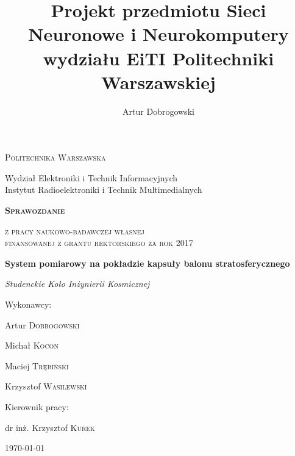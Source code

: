 \documentclass[a4paper,12pt]{article}
\title{Projekt przedmiotu Sieci Neuronowe i Neurokomputery wydziału EiTI Politechniki Warszawskiej}
\author{Artur Dobrogowski}
\newcommand{\radikalwut}{}
\begin{document}
\begin{titlepage}
    \centering
    {\scshape\Large {\radikalwut Politechnika Warszawska}\\\par Wydział Elektroniki i Technik Informacyjnych\\Instytut Radioelektroniki i Technik Multimedialnych \par}
    \vspace{1cm}
    {\huge\scshape\bfseries Sprawozdanie\\\par}
    {\scshape\Large z pracy naukowo-badawczej własnej\\ finansowanej z grantu rektorskiego za rok 2017\\\par}
    \vspace{1cm}
    {\Large\bfseries System pomiarowy na pokładzie kapsuły balonu stratosferycznego\\\par}
    \vspace{1cm}
    {\Large\textsl {Studenckie Koło Inżynierii Kosmicznej}\par}
    \vfill
    Wykonawcy: \par
    {\small
    \begin{multicols}{2}

    \par Artur \textsc{Dobrogowski} 
    \par Michał \textsc{Kocon}
    \par Maciej \textsc{Trębiński}
    \par Krzysztof \textsc{Wasilewski}
    \end{multicols}
}
    Kierownik pracy:\par
    dr inż. Krzysztof \textsc{Kurek}

    \vfill

    {\large \today\par}
\end{titlepage}

\tableofcontents











% 



\label{ENDOFDOC}
\end{document}
